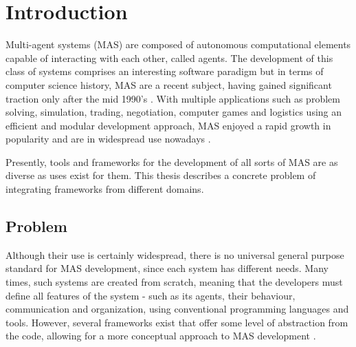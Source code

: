 \chapter{Introduction}
\label{chap:introduction}
Multi-agent systems (MAS) are composed of autonomous computational elements capable of interacting with each other, called agents. The development of this class of systems comprises an interesting software paradigm but in terms of computer science history, MAS are a recent subject, having gained significant traction only after the mid 1990's \cite{wooldridge2008introduction}. With multiple applications such as problem solving, simulation, trading, negotiation, computer games and logistics using an efficient and modular development approach, MAS enjoyed a rapid growth in popularity and are in widespread use nowadays \cite{ferber1999multi}.

Presently, tools and frameworks for the development of all sorts of MAS are as diverse as uses exist for them. This thesis describes a concrete problem of integrating frameworks from different domains.

\section{Problem}

Although their use is certainly widespread, there is no universal general purpose standard for MAS development, since each system has different needs. Many times, such systems are created from scratch, meaning that the developers must define all features of the system - such as its agents, their behaviour, communication and organization, using conventional programming languages and tools. However, several frameworks exist that offer some level of abstraction from the code, allowing for a more conceptual approach to
MAS development \cite{gormer2011jrep}. 

